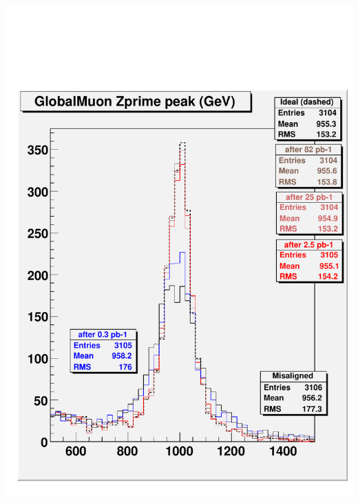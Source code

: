 \documentclass[compress]{beamer}
\begin{document}
\begin{frame}
\begin{center}
\begin{minipage}{0.8\linewidth}
\begin{columns}
\includegraphics[width=\linewidth]{checkit_globZprime.pdf}
\end{columns}
\end{minipage}
\end{center}
\end{frame}
\end{document}
